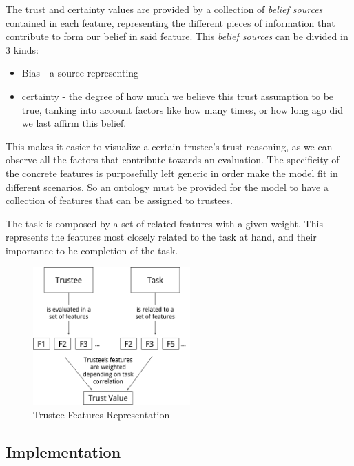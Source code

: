 The trust and certainty values are provided by a collection of \textit{belief sources} contained in each feature, representing the different pieces of information that contribute to form our belief in said feature. This \textit{belief sources} can be divided in 3 kinds: 
\begin{itemize}
	\item Bias - a source representing 
	\item certainty - the degree of how much we believe this trust assumption to be true, tanking into account factors like how many times, or how long ago did we last affirm this belief.
\end{itemize}

This makes it easier to visualize a certain trustee's trust reasoning, as we can observe all the factors that contribute towards an evaluation. The specificity of the concrete features is purposefully left generic in order make the model fit in different scenarios. So an ontology must be provided for the model to have a collection of features that can be assigned to trustees.



The task is composed by a set of related features with a given weight. This represents the features most closely related to the task at hand, and their importance to he completion of the task.


\begin{figure}[hbt]
	\centering
	\includegraphics[height=200px]{figures/Trust_Model_Diagram.png}
	\caption{Trustee Features Representation}
	\label{fig:trustee}
\end{figure}


\subsection{Implementation}

